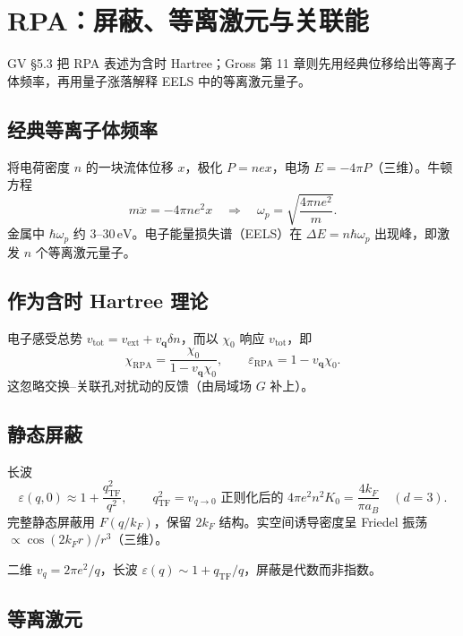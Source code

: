 \section{RPA：屏蔽、等离激元与关联能}

GV §5.3 把 RPA 表述为含时 Hartree；Gross 第 11 章则先用经典位移给出等离子体频率，再用量子涨落解释 EELS 中的等离激元量子。

\subsection{经典等离子体频率}

将电荷密度 $n$ 的一块流体位移 $x$，极化 $P=nex$，电场 $E=-4\pi P$（三维）。牛顿方程
\begin{equation}
  m\ddot x=-4\pi n e^2 x
  \quad\Rightarrow\quad
  \omega_p=\sqrt{\frac{4\pi n e^2}{m}}.
\end{equation}
金属中 $\hbar\omega_p$ 约 $3$--$30\,\mathrm{eV}$。电子能量损失谱（EELS）在 $\Delta E=n\hbar\omega_p$ 出现峰，即激发 $n$ 个等离激元量子。

\subsection{作为含时 Hartree 理论}

电子感受总势 $v_{\mathrm{tot}}=v_{\mathrm{ext}}+v_{\mathbf{q}}\delta n$，而以 $\chi_0$ 响应 $v_{\mathrm{tot}}$，即
\begin{equation}
  \chi_{\mathrm{RPA}}
  =\frac{\chi_0}{1-v_{\mathbf{q}}\chi_0},
  \qquad
  \varepsilon_{\mathrm{RPA}}=1-v_{\mathbf{q}}\chi_0.
\label{eq:RPA}
\end{equation}
这忽略交换--关联孔对扰动的反馈（由局域场 $G$ 补上）。

\subsection{静态屏蔽}

长波
\begin{equation}
  \varepsilon(q,0)
  \approx1+\frac{q_{\mathrm{TF}}^2}{q^2},
  \qquad
  q_{\mathrm{TF}}^2=v_{q\to0}\text{ 正则化后的 }4\pi e^2 n^2 K_0
  =\frac{4k_F}{\pi a_B}\quad(d=3).
\end{equation}
完整静态屏蔽用 $F(q/k_F)$，保留 $2k_F$ 结构。实空间诱导密度呈 Friedel 振荡 $\propto\cos(2k_F r)/r^3$（三维）。

二维 $v_q=2\pi e^2/q$，长波 $\varepsilon(q)\sim 1+q_{\mathrm{TF}}/q$，屏蔽是代数而非指数。

\subsection{等离激元}

